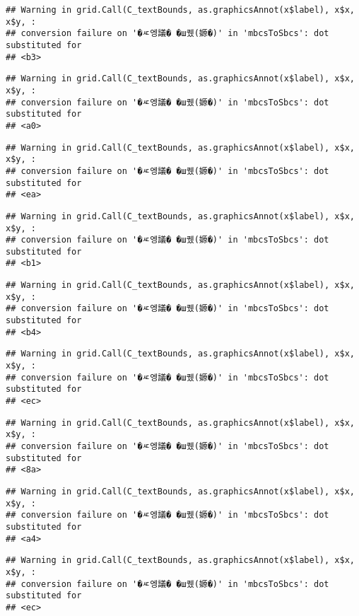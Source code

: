 \documentclass[
]{article}
\begin{document}
\begin{verbatim}
## Warning in grid.Call(C_textBounds, as.graphicsAnnot(x$label), x$x, x$y, :
## conversion failure on '�ㅼ엥議� �ш퀬(嫄�)' in 'mbcsToSbcs': dot substituted for
## <b3>
\end{verbatim}

\begin{verbatim}
## Warning in grid.Call(C_textBounds, as.graphicsAnnot(x$label), x$x, x$y, :
## conversion failure on '�ㅼ엥議� �ш퀬(嫄�)' in 'mbcsToSbcs': dot substituted for
## <a0>
\end{verbatim}

\begin{verbatim}
## Warning in grid.Call(C_textBounds, as.graphicsAnnot(x$label), x$x, x$y, :
## conversion failure on '�ㅼ엥議� �ш퀬(嫄�)' in 'mbcsToSbcs': dot substituted for
## <ea>
\end{verbatim}

\begin{verbatim}
## Warning in grid.Call(C_textBounds, as.graphicsAnnot(x$label), x$x, x$y, :
## conversion failure on '�ㅼ엥議� �ш퀬(嫄�)' in 'mbcsToSbcs': dot substituted for
## <b1>
\end{verbatim}

\begin{verbatim}
## Warning in grid.Call(C_textBounds, as.graphicsAnnot(x$label), x$x, x$y, :
## conversion failure on '�ㅼ엥議� �ш퀬(嫄�)' in 'mbcsToSbcs': dot substituted for
## <b4>
\end{verbatim}

\begin{verbatim}
## Warning in grid.Call(C_textBounds, as.graphicsAnnot(x$label), x$x, x$y, :
## conversion failure on '�ㅼ엥議� �ш퀬(嫄�)' in 'mbcsToSbcs': dot substituted for
## <ec>
\end{verbatim}

\begin{verbatim}
## Warning in grid.Call(C_textBounds, as.graphicsAnnot(x$label), x$x, x$y, :
## conversion failure on '�ㅼ엥議� �ш퀬(嫄�)' in 'mbcsToSbcs': dot substituted for
## <8a>
\end{verbatim}

\begin{verbatim}
## Warning in grid.Call(C_textBounds, as.graphicsAnnot(x$label), x$x, x$y, :
## conversion failure on '�ㅼ엥議� �ш퀬(嫄�)' in 'mbcsToSbcs': dot substituted for
## <a4>
\end{verbatim}

\begin{verbatim}
## Warning in grid.Call(C_textBounds, as.graphicsAnnot(x$label), x$x, x$y, :
## conversion failure on '�ㅼ엥議� �ш퀬(嫄�)' in 'mbcsToSbcs': dot substituted for
## <ec>
\end{verbatim}
\end{document}
